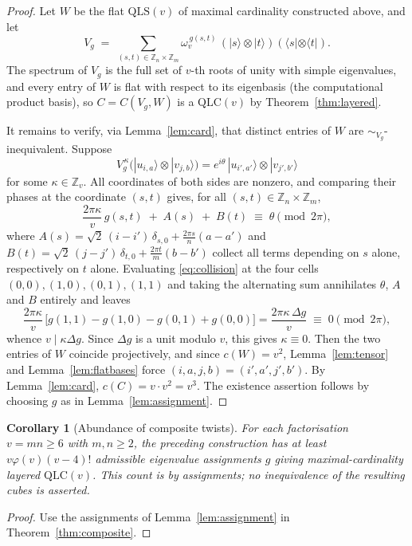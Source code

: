 \documentclass[11pt]{amsart}
\newtheorem{corollary}[theorem]{Corollary}
\theoremstyle{definition}
\newcommand{\Z}{\mathbb{Z}}
\newcommand{\ket}[1]{|#1\rangle}
\newcommand{\bra}[1]{\langle #1|}
\newcommand{\QLS}{\mathrm{QLS}}
\newcommand{\QLC}{\mathrm{QLC}}
\begin{document}
\begin{proof}
Let $W$ be the flat $\QLS(v)$ of maximal cardinality constructed above, and
let
\[
V_g\;=\;\sum_{(s,t)\in\Z_n\times\Z_m}\omega_v^{\,g(s,t)}\,
(\ket s\otimes\ket t)(\bra s\otimes\bra t) .
\]
The spectrum of $V_g$ is the full set of $v$-th roots of unity with simple
eigenvalues, and every entry of $W$ is flat with respect to its eigenbasis
(the computational product basis), so $C=C(V_g,W)$ is a $\QLC(v)$ by
Theorem~\ref{thm:layered}.

It remains to verify, via Lemma~\ref{lem:card}, that distinct entries of
$W$ are $\sim_{V_g}$-inequivalent.  Suppose
\[
V_g^{\,\kappa}\bigl(\ket{u_{i,a}}\otimes\ket{v_{j,b}}\bigr)
=e^{i\theta}\,\ket{u_{i',a'}}\otimes\ket{v_{j',b'}}
\]
for some $\kappa\in\Z_v$.  All coordinates of both sides are nonzero, and
comparing their phases at the coordinate $(s,t)$ gives, for all
$(s,t)\in\Z_n\times\Z_m$,
\begin{equation}\label{eq:collision}
\frac{2\pi\kappa}{v}\,g(s,t)\;+\;A(s)\;+\;B(t)\;\equiv\;\theta
\pmod{2\pi},
\end{equation}
where
$A(s)=\sqrt2\,(i-i')\,\delta_{s,0}+\tfrac{2\pi s}{n}(a-a')$ and
$B(t)=\sqrt2\,(j-j')\,\delta_{t,0}+\tfrac{2\pi t}{m}(b-b')$ collect all
terms depending on $s$ alone, respectively on $t$ alone.  Evaluating
\eqref{eq:collision} at the four cells $(0,0),(1,0),(0,1),(1,1)$ and
taking the alternating sum annihilates $\theta$, $A$ and $B$ entirely and
leaves
\[
\frac{2\pi\kappa}{v}\,\bigl[g(1,1)-g(1,0)-g(0,1)+g(0,0)\bigr]
=\frac{2\pi\kappa\,\Delta g}{v}\;\equiv\;0\pmod{2\pi},
\]
whence $v\mid\kappa\Delta g$.  Since $\Delta g$ is a unit modulo $v$, this
gives $\kappa\equiv0$.  Then the two entries of $W$
coincide projectively, and since $c(W)=v^2$, Lemma~\ref{lem:tensor} and
Lemma~\ref{lem:flatbases} force $(i,a,j,b)=(i',a',j',b')$.  By
Lemma~\ref{lem:card}, $c(C)=v\cdot v^2=v^3$.
The existence assertion follows by choosing $g$ as in
Lemma~\ref{lem:assignment}.
\end{proof}

\begin{corollary}[Abundance of composite twists]\label{cor:many-composite}
For each factorisation $v=mn\ge6$ with $m,n\ge2$, the preceding construction
has at least $v\varphi(v)(v-4)!$ admissible eigenvalue assignments $g$ giving
maximal-cardinality layered $\QLC(v)$.  This count is by assignments; no
inequivalence of the resulting cubes is asserted.
\end{corollary}

\begin{proof}
Use the assignments of Lemma~\ref{lem:assignment} in
Theorem~\ref{thm:composite}.
\end{proof}
\end{document}
